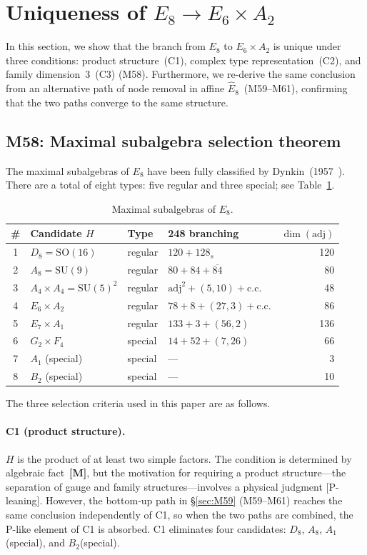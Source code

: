 \documentclass[sn-mathphys-num,Numbered]{sn-jnl}
\theoremstyle{thmstyleone}
\theoremstyle{thmstylethree}
\newcommand{\SU}{\mathrm{SU}}
\newcommand{\SO}{\mathrm{SO}}
\newcommand{\Ehat}{\hat{E}}
\newcommand{\adj}{\mathrm{adj}}
\newcommand{\layerM}{\textbf{[M]}}
\begin{document}
\section{Uniqueness of $E_8 \to E_6 \times A_2$}\label{sec:E8selection}

In this section, we show that the branch from $E_8$ to $E_6 \times A_2$ is
unique under three conditions: product structure~(C1), complex type
representation~(C2), and family dimension~3~(C3) (M58).  Furthermore, we
re-derive the same conclusion from an alternative path of node removal in
affine $\Ehat_8$~(M59--M61), confirming that the two paths converge to the
same structure.


\subsection{M58: Maximal subalgebra selection theorem}\label{sec:M58}

The maximal subalgebras of $E_8$ have been fully classified by
Dynkin~(1957~\cite{Dynkin1957}).  There are a total of eight types: five
regular and three special; see Table~\ref{tab:E8max}.

\begin{table}[htb]
\centering
\caption{Maximal subalgebras of $E_8$.}\label{tab:E8max}
\begin{tabular}{clllr}
\toprule
\# & Candidate $H$ & Type & 248 branching & $\dim(\adj)$ \\
\midrule
1 & $D_8 = \SO(16)$ & regular & $120 + 128_s$ & 120 \\
2 & $A_8 = \SU(9)$ & regular & $80 + 84 + \overline{84}$ & 80 \\
3 & $A_4 \times A_4 = \SU(5)^2$ & regular & $\adj^2 + (5,10) + \text{c.c.}$ & 48 \\
4 & $E_6 \times A_2$ & regular & $78 + 8 + (27,3) + \text{c.c.}$ & 86 \\
5 & $E_7 \times A_1$ & regular & $133 + 3 + (56,2)$ & 136 \\
6 & $G_2 \times F_4$ & special & $14 + 52 + (7,26)$ & 66 \\
7 & $A_1$ (special) & special & --- & 3 \\
8 & $B_2$ (special) & special & --- & 10 \\
\bottomrule
\end{tabular}
\end{table}

The three selection criteria used in this paper are as follows.

\paragraph{C1 (product structure).}
$H$ is the product of at least two simple factors.  The condition is
determined by algebraic fact~\layerM, but the motivation for requiring a
product structure---the separation of gauge and family structures---involves a
physical judgment [P-leaning].  However, the bottom-up path in
\S\ref{sec:M59} (M59--M61) reaches the same conclusion independently of C1,
so when the two paths are combined, the P-like element of C1 is absorbed.  C1
eliminates four candidates: $D_8$, $A_8$, $A_1$(special), and $B_2$(special).
\end{document}
